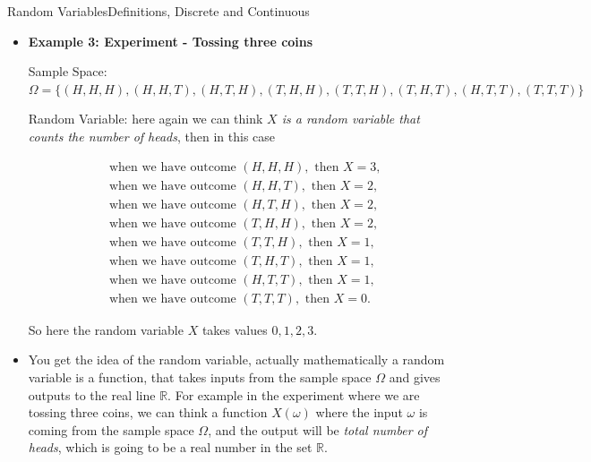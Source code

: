 \documentclass[8pt, usepdftitle = false]{beamer}
\begin{document}
\begin{frame}[allowframebreaks]{Random Variables}{Definitions, Discrete and Continuous}
\begin{itemize}
\medskip
So here the random variable $X$ takes values $0, 1, 2$. 
\medskip

Note we can also think about different random variables in this setting, for example we can think about \emph{total number of tails}, or \emph{whether we have at least one head}, etc. 

\medskip



\item \textbf{Example 3: Experiment - Tossing three coins }

\medskip
\alert{Sample Space:}  {\small $\Omega = \{{(H, H, H)}, {(H,H,T)}, {(H,T,H)}, {(T,H,H)}, {(T,T,H)}, {(T,H,T)}, {(H,T,T)}, {(T,T,T)} \}	$ }


\medskip
\alert{Random Variable:} here again we can think \emph{ $X$ is a random variable that counts the number of heads}, then in this case 

\begin{align*}
\text{ when we have outcome } {(H, H, H)}, \text{ then } X = 3, \\
\text{ when we have outcome } {(H,H,T)}, \text{ then } X = 2, \\ 
\text{ when we have outcome } {(H,T,H)}, \text{ then } X = 2, \\ 
\text{ when we have outcome } {(T,H,H)}, \text{ then } X = 2, \\ 
\text{ when we have outcome } {(T,T,H)}, \text{ then } X = 1, \\ 
\text{ when we have outcome } {(T,H,T)}, \text{ then } X = 1, \\ 
\text{ when we have outcome } {(H,T,T)}, \text{ then } X = 1, \\ 
\text{ when we have outcome } {(T,T,T)}, \text{ then } X = 0. 
\end{align*}


\medskip
So here the random variable $X$ takes values $0, 1, 2, 3$. 

\framebreak

\item You get the idea of the random variable, actually mathematically a random variable is a function, that takes inputs from the sample space $\Omega$ and gives outputs to the real line $\mathbb{R}$. For example in the experiment where we are tossing three coins, we can think a function $X(\omega)$ where the input $\omega$ is coming from the sample space $\Omega$, and the output will be \emph{total number of heads}, which is going to be a real number in the set $\mathbb{R}$.



\end{itemize}
\end{frame}
\end{document}
